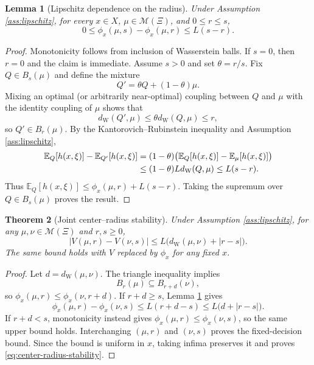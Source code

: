 \documentclass[11pt]{article}
\newtheorem{theorem}{Theorem}[section]
\newtheorem{lemma}[theorem]{Lemma}
\newcommand{\E}{\mathbb{E}}
\newcommand{\cM}{\mathcal{M}}
\newcommand{\XiSet}{\Xi}
\newcommand{\1}{\mathbf{1}}
\newcommand{\dW}{d_{\mathrm W}}
\begin{document}
\begin{lemma}[Lipschitz dependence on the radius]\label{lem:radius-lipschitz}
Under Assumption \ref{ass:lipschitz}, for every $x\in X$, $\mu\in\cM(\XiSet)$, and $0\le r\le s$,
\begin{equation}
    0\le \phi_x(\mu,s)-\phi_x(\mu,r)\le L(s-r).
\end{equation}
\end{lemma}

\begin{proof}
Monotonicity follows from inclusion of Wasserstein balls. If $s=0$, then $r=0$ and the claim is immediate. Assume $s>0$ and set $\theta=r/s$. Fix $Q\in B_s(\mu)$ and define the mixture
\begin{equation}
    Q'=\theta Q+(1-\theta)\mu.
\end{equation}
Mixing an optimal (or arbitrarily near-optimal) coupling between $Q$ and $\mu$ with the identity coupling of $\mu$ shows that
\begin{equation}
    \dW(Q',\mu)\le\theta\dW(Q,\mu)\le r,
\end{equation}
so $Q'\in B_r(\mu)$. By the Kantorovich--Rubinstein inequality and Assumption \ref{ass:lipschitz},
\begin{align}
\E_Q[h(x,\xi)]-\E_{Q'}[h(x,\xi)]
&=(1-\theta)\bigl(\E_Q[h(x,\xi)]-\E_\mu[h(x,\xi)]\bigr)\notag\\
&\le (1-\theta)L\dW(Q,\mu)\le L(s-r).
\end{align}
Thus $\E_Q[h(x,\xi)]\le\phi_x(\mu,r)+L(s-r)$. Taking the supremum over $Q\in B_s(\mu)$ proves the result.
\end{proof}

\begin{theorem}[Joint center--radius stability]\label{thm:center-radius-stability}
Under Assumption \ref{ass:lipschitz}, for any $\mu,\nu\in\cM(\XiSet)$ and $r,s\ge0$,
\begin{equation}\label{eq:center-radius-stability}
    |V(\mu,r)-V(\nu,s)|
    \le L\bigl(\dW(\mu,\nu)+|r-s|\bigr).
\end{equation}
The same bound holds with $V$ replaced by $\phi_x$ for any fixed $x$.
\end{theorem}

\begin{proof}
Let $d=\dW(\mu,\nu)$. The triangle inequality implies
\begin{equation}
B_r(\mu)\subseteq B_{r+d}(\nu),
\end{equation}
so $\phi_x(\mu,r)\le\phi_x(\nu,r+d)$. If $r+d\ge s$, Lemma \ref{lem:radius-lipschitz} gives
\begin{equation}
\phi_x(\mu,r)-\phi_x(\nu,s)
\le L(r+d-s)\le L\bigl(d+|r-s|\bigr).
\end{equation}
If $r+d<s$, monotonicity instead gives $\phi_x(\mu,r)\le\phi_x(\nu,s)$, so the same upper bound holds. Interchanging $(\mu,r)$ and $(\nu,s)$ proves the fixed-decision bound. Since the bound is uniform in $x$, taking infima preserves it and proves \eqref{eq:center-radius-stability}.
\end{proof}
\end{document}
